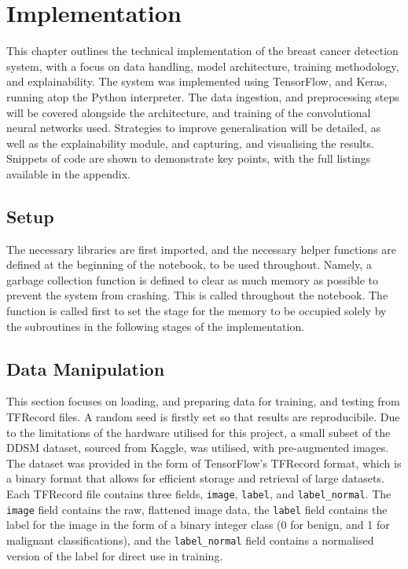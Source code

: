 \documentclass[../main]{subfiles}
\begin{document}
\chapter{Implementation}
This chapter outlines the technical implementation of the breast cancer
detection system, with a focus on data handling, model architecture, training
methodology, and explainability. The system was implemented using TensorFlow,
and Keras, running atop the Python interpreter. The data ingestion, and
preprocessing steps will be covered alongside the architecture, and training of
the convolutional neural networks used. Strategies to improve generalisation
will be detailed, as well as the explainability module, and capturing, and
visualising the results. Snippets of code are shown to demonstrate key points,
with the full listings available in the appendix.

\section{Setup}
The necessary libraries are first imported, and the necessary helper functions
are defined at the beginning of the notebook, to be used throughout. Namely, a
garbage collection function is defined to clear as much memory as possible to
prevent the system from crashing. This is called throughout the notebook. The
function is called first to set the stage for the memory to be occupied solely
by the subroutines in the following stages of the implementation.

\section{Data Manipulation}
This section focuses on loading, and preparing data for training, and testing
from TFRecord files. A random seed is firstly set so that results are
reproducibile. Due to the limitations of the hardware utilised for this
project, a small subset of the DDSM dataset, sourced from Kaggle, was utilised,
with pre-augmented images. The dataset was provided in the form of TensorFlow's
TFRecord format, which is a binary format that allows for efficient storage and
retrieval of large datasets. Each TFRecord file contains three fields,
\texttt{image}, \texttt{label}, and \texttt{label\_normal}. The \texttt{image}
field contains the raw, flattened image data, the \texttt{label} field contains
the label for the image in the form of a binary integer class (0 for benign,
and 1 for malignant classifications), and the \texttt{label\_normal} field
contains a normalised version of the label for direct use in training.
\end{document}
